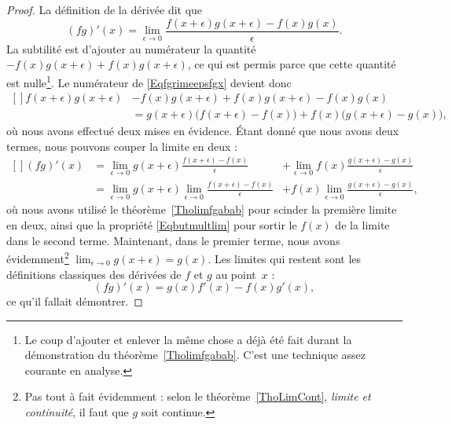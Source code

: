 \begin{proof}
La définition de la dérivée dit que
\begin{equation}        \label{Eqfgrimeepsfgx}
    (fg)'(x)=\lim_{\epsilon\to 0}\frac{f(x+\epsilon)g(x+\epsilon)-f(x)g(x)}{\epsilon}.
\end{equation}
La subtilité est d'ajouter au numérateur la quantité $-f(x)g(x+\epsilon)+f(x)g(x+\epsilon)$, ce qui est permis parce que cette quantité est nulle\footnote{Le coup d'ajouter et enlever la même chose a déjà été fait durant la démonstration du théorème~\ref{Tholimfgabab}. C'est une technique assez courante en analyse.}. Le numérateur de \eqref{Eqfgrimeepsfgx} devient donc
\begin{equation}
    \begin{aligned}[]
f(x+\epsilon)g(x+\epsilon)&-f(x)g(x+\epsilon)+f(x)g(x+\epsilon)-f(x)g(x) \\
            &= g(x+\epsilon)\big( f(x+\epsilon)-f(x) \big)+f(x)\big( g(x+\epsilon)-g(x) \big),
    \end{aligned}
\end{equation}
où nous avons effectué deux mises en évidence. Étant donné que nous avons deux termes, nous pouvons couper la limite en deux :
\begin{equation}
    \begin{aligned}[]
        (fg)'(x)    &=\lim_{\epsilon\to 0}g(x+\epsilon)\frac{ f(x+\epsilon)-f(x) }{\epsilon}            &+\lim_{\epsilon\to 0}f(x)\frac{ g(x+\epsilon)-g(x) }{\epsilon}\\
                &=\lim_{\epsilon\to 0}g(x+\epsilon)\lim_{\epsilon\to 0}\frac{ f(x+\epsilon)-f(x) }{\epsilon}    &+f(x)\lim_{\epsilon\to 0}\frac{ g(x+\epsilon)-g(x) }{\epsilon},
    \end{aligned}
\end{equation}
où nous avons utilisé le théorème~\ref{Tholimfgabab} pour scinder la première limite en deux, ainsi que la propriété \eqref{Eqbutmultlim} pour sortir le $f(x)$ de la limite dans le second terme. Maintenant, dans le premier terme, nous avons évidemment\footnote{Pas tout à fait évidemment : selon le théorème~\ref{ThoLimCont}, \emph{limite et continuité}, il faut que $g$ soit continue.} $\lim_{\epsilon\to 0}g(x+\epsilon)=g(x)$. Les limites qui restent sont les définitions classiques des dérivées de $f$ et $g$ au point~$x$ :
\begin{equation}
    (fg)'(x)=g(x)f'(x)-f(x)g'(x),
\end{equation}
ce qu'il fallait démontrer.
\end{proof}

